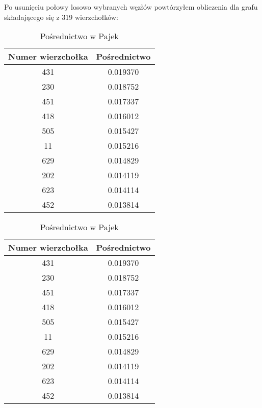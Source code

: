 \documentclass[a4paper,10pt]{article}
\begin{document}
			Po usunięciu połowy losowo wybranych węzłów powtórzyłem obliczenia dla grafu składającego się z 319 wierzchołków:
			\begin{table}[H]
			\parbox{.45\linewidth}{
			\caption*{Pośrednictwo w \mbox{NetworkX}}
			\begin{tabular}{ c | c } \hline
				Numer wierzchołka & Pośrednictwo \\ \hline
				431 & 0.019370 \\
				230 & 0.018752 \\
				451 & 0.017337 \\
				418 & 0.016012 \\
				505 & 0.015427 \\
				11  & 0.015216 \\
				629 & 0.014829 \\
				202 & 0.014119 \\
				623 & 0.014114 \\
				452 & 0.013814 \\\hline
			\end{tabular}
			}
			\hfill
			\parbox{.45\linewidth}{
			\caption*{Pośrednictwo w Pajek}
			\begin{tabular}{ c | c } \hline
				Numer wierzchołka & Pośrednictwo \\ \hline
				431 & 0.019370 \\
  				230 & 0.018752 \\
  				451 & 0.017337 \\ 
				418 & 0.016012 \\
				505 & 0.015427 \\
				11 & 0.015216  \\
				629 & 0.014829 \\
				202 & 0.014119 \\
				623 & 0.014114 \\
				452 & 0.013814 \\\hline
			\end{tabular}
			}
			\end{table}
\end{document}
